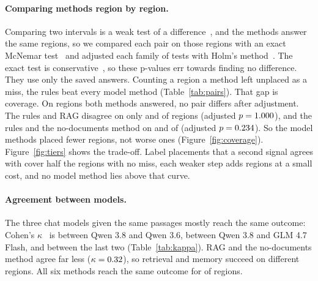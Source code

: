 \documentclass[10pt,twocolumn]{article}
\begin{document}
\paragraph{Comparing methods region by region.} Comparing two intervals is a weak test of a difference~\citep{schenker2001judging}, and the methods answer the same regions, so we compared each pair on those regions with an exact McNemar test~\citep{mcnemar1947note} and adjusted each family of tests with Holm's method~\citep{holm1979simple}. The exact test is conservative~\citep{fagerland2013mcnemar}, so these p-values err towards finding no difference. They use only the saved answers. Counting a region a method left unplaced as a miss, the rules beat every model method (Table~\ref{tab:pairs}). That gap is coverage. On regions both methods answered, no pair differs after adjustment. The rules and RAG disagree on only \statRulesVsRagAnsweredOnlyFirst{} and \statRulesVsRagAnsweredOnlySecond{} of \statRulesVsRagAnsweredPairs{} regions (adjusted $p=1.000{}$), and the rules and the no-documents method on \statRulesVsMemoryAnsweredOnlyFirst{} and \statRulesVsMemoryAnsweredOnlySecond{} of \statRulesVsMemoryAnsweredPairs{} (adjusted $p=0.234{}$). So the model methods placed fewer regions, not worse ones (Figure~\ref{fig:coverage}). Figure~\ref{fig:tiers} shows the trade-off. Label placements that a second signal agrees with cover half the regions with no miss, each weaker step adds regions at a small cost, and no model method lies above that curve.

\paragraph{Agreement between models.} The three chat models given the same passages mostly reach the same outcome: Cohen's $\kappa$~\citep{cohen1960coefficient} is \statRagAndRagQwenthreeSixKappa{} between Qwen 3.8 and Qwen 3.6, \statRagAndRagGlmFourSevenKappa{} between Qwen 3.8 and GLM 4.7 Flash, and \statRagQwenthreeSixAndRagGlmFourSevenKappa{} between the last two (Table~\ref{tab:kappa}). RAG and the no-documents method agree far less ($\kappa=0.32{}$), so retrieval and memory succeed on different regions. All six methods reach the same outcome for \statAllAgree{} of \llmRulesRegions{} regions.
\end{document}
